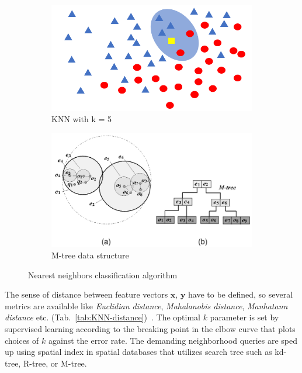 \begin{figure}[ht]
    \centering
    \begin{subfigure}[b]{0.49\textwidth}
        \includegraphics[width=\textwidth]{assets/analysis/KNN.png}
        \caption{KNN with k = 5}
        \label{fig:KNN}
    \end{subfigure}
    \hfill
    \begin{subfigure}[b]{0.49\textwidth}
        \includegraphics[width=\textwidth]{assets/analysis/M-tree.png}
        \caption{M-tree data structure}
        \label{fig:m-tree}
    \end{subfigure}
    \caption{Nearest neighbors classification algorithm~\cite{chen_skyline_2009}}
\end{figure}

The sense of distance between feature vectors $\mathbf{x}$, $\mathbf{y}$ have to be defined, so several metrics are available like \emph{Euclidian distance}, \emph{Mahalanobis distance}, \emph{Manhatann distance} etc. (Tab.~\ref{tab:KNN-distance})~\cite{sheng_review_2020, abu_alfeilat_effects_2019}. The optimal $k$ parameter is set by supervised learning according to the breaking point in the elbow curve that plots choices of $k$ against the error rate. The demanding neighborhood queries are sped up using spatial index in spatial databases that utilizes search tree such as kd-tree, R-tree, or M-tree.

